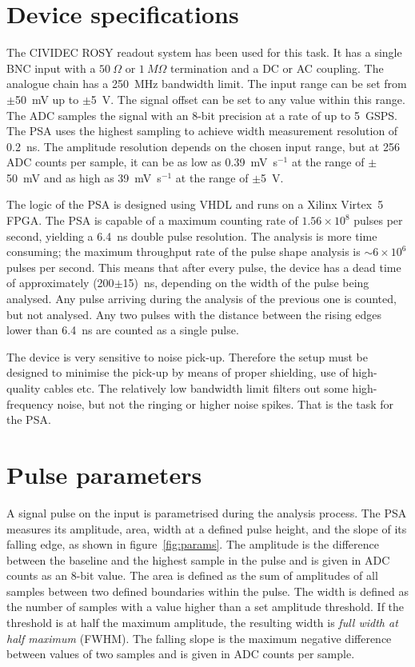 \section{Device specifications}
The CIVIDEC ROSY readout system has been used for this task. It has a single BNC input with a $50~\Omega$ or $1~M\Omega$ termination and a DC or AC coupling. The analogue chain has a 250~MHz bandwidth limit. The input range can be set from $\pm$50~mV up to $\pm$5~V. The signal offset can be set to any value within this range. The ADC samples the signal with an 8-bit precision at a rate of up to 5~GSPS. The PSA uses the highest sampling to achieve width measurement resolution of 0.2~ns. 
The amplitude resolution depends on the chosen input range, but at 256 ADC counts per sample, it can be as low as 0.39~mV~s$^{-1}$ at the range of $\pm$50~mV and as high as 39~mV~s$^{-1}$ at the range of $\pm$5~V.

The logic of the PSA is designed using VHDL and runs on a Xilinx Virtex~5 FPGA. The PSA is capable of a maximum counting rate of $1.56\times10^8$ pulses per second, yielding a 6.4~ns double pulse resolution. The analysis is more time consuming; the maximum throughput rate of the pulse shape analysis is $\sim6\times10^6$ pulses per second. This means that after every pulse, the device has a dead time of approximately (200$\pm$15)~ns, depending on the width of the pulse being analysed. Any pulse arriving during the analysis of the previous one is counted, but not analysed. Any two pulses with the distance between the rising edges lower than 6.4~ns are counted as a single pulse.

The device is very sensitive to noise pick-up. Therefore the setup must be designed to minimise the pick-up by means of proper shielding, use of high-quality cables etc. The relatively low bandwidth limit filters out some high-frequency noise, but not the ringing or higher noise spikes. That is the task for the PSA.


\section{Pulse parameters}
\label{sec:pulsepar}
A signal pulse on the input is parametrised during the analysis process. The PSA measures its amplitude, area, width at a defined pulse height, and the slope of its falling edge, as shown in figure~\ref{fig:params}. The amplitude is the difference between the baseline and the highest sample in the pulse and is given in ADC counts as an 8-bit value. The area is defined as the sum of amplitudes of all samples between two defined boundaries within the pulse. The width is defined as the number of samples with a value higher than a set amplitude threshold. If the threshold is at half the maximum amplitude, the resulting width is \emph{full width at half maximum} (FWHM). The falling slope is the maximum negative difference between values of two samples and is given in ADC counts per sample. 



